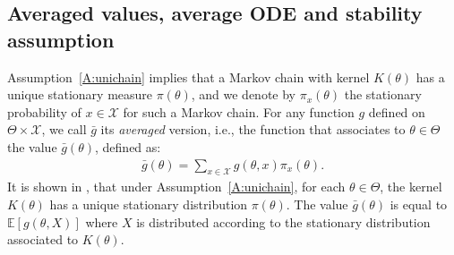 \documentclass{article}
\newcommand{\calX}{\mathcal{X}}
\newcommand\E{\mathbb{E}}
\newcommand\esp[1]{\E\left[#1\right]}
\begin{document}
\subsection{Averaged values, average ODE and stability assumption}

Assumption~\ref{A:unichain} implies that a Markov chain with kernel $K(\theta)$ has a unique stationary measure $\pi(\theta)$, and we denote by $\pi_x(\theta)$ the stationary probability of $x\in\calX$ for such a Markov chain. For any function $g$ defined on $\Theta\times\calX$, we call $\bar{g}$ its \emph{averaged} version, i.e., the function that associates to $\theta\in\Theta$ the value $\bar{g}(\theta)$, defined as: 
\begin{align}
    \bar{g}(\theta) = \sum_{x\in\calX}g(\theta, x)\pi_x(\theta).
    \label{eq:bar_g}
\end{align}
It is shown in \cite[Lemma~4]{allmeier2023bias}, that under Assumption~\ref{A:unichain}, for each $\theta\in\Theta$, the kernel $K(\theta)$ has a unique stationary distribution $\pi(\theta)$. The value $\bar{g}(\theta)$ is equal to $\esp{g(\theta,X)}$ where $X$ is distributed according to the stationary distribution associated to $K(\theta)$. 
\end{document}
